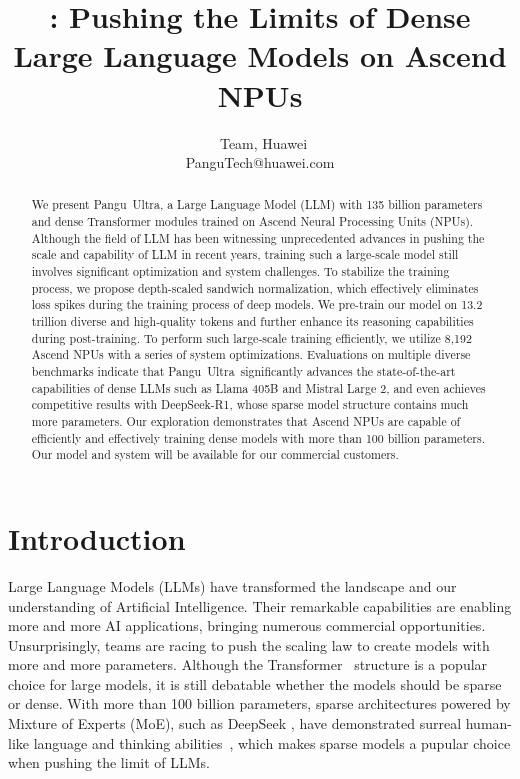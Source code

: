 \documentclass{article}
\title{\modelname: Pushing the Limits of Dense Large Language Models on Ascend NPUs}
\author{\pangu~Team, Huawei\\
PanguTech@huawei.com}
\newcommand{\pangu}{Pangu}
\newcommand{\modelname}{\pangu~Ultra}
\begin{document}
\maketitle

\thispagestyle{fancy}


\begin{abstract}

We present \modelname, a Large Language Model (LLM) with 135 billion parameters and dense Transformer modules trained on Ascend Neural Processing Units (NPUs). Although the field of LLM has been witnessing unprecedented advances in pushing the scale and capability of LLM in recent years, training such a large-scale model still involves significant optimization and system challenges. To stabilize the training process, we propose depth-scaled sandwich normalization, which effectively eliminates loss spikes during the training process of deep models. We pre-train our model on 13.2 trillion diverse and high-quality tokens and further enhance its reasoning capabilities during post-training. To perform such large-scale training efficiently, we utilize 8,192 Ascend NPUs with a series of system optimizations. Evaluations on multiple diverse benchmarks indicate that \modelname~significantly advances the state-of-the-art capabilities of dense LLMs such as Llama 405B and Mistral Large
2, and even achieves competitive results with DeepSeek-R1, whose sparse model structure contains much more parameters. Our exploration demonstrates that Ascend NPUs are capable of efficiently and effectively training dense models with more than 100 billion parameters. 
Our model and system will be available for our commercial customers.
\end{abstract}



\section{Introduction}

Large Language Models (LLMs) have transformed the landscape and our understanding of Artificial Intelligence. Their remarkable capabilities are enabling more and more AI applications, bringing numerous commercial opportunities. Unsurprisingly, teams are racing to push the scaling law to create models with more and more parameters. Although the Transformer~\cite{vaswani2017attention} structure is a popular choice for large models, it is still debatable whether the models should be sparse or dense. With more than 100 billion parameters, sparse architectures powered by Mixture of Experts (MoE), such as DeepSeek \cite{liu2024deepseek,deepseekv3}, have demonstrated surreal human-like language and thinking abilities~\cite{jones2025large}, which makes sparse models a pupular choice when pushing the limit of LLMs.
\end{document}
